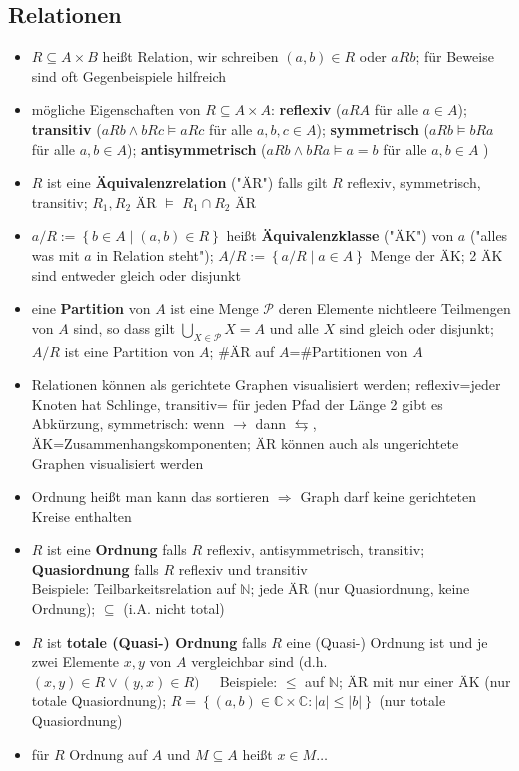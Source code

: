 \documentclass[10pt,a4paper]{article}
\begin{document}
\subsection{Relationen}
\begin{itemize}
\item $R\subseteq A\times B$ heißt Relation, wir schreiben $(a,b) \in R$ oder $aRb$; für Beweise sind oft Gegenbeispiele hilfreich
\item mögliche Eigenschaften von $R\subseteq A\times A$: \textbf{reflexiv} ($aRA$ für alle $a\in A$); \textbf{transitiv} ($aRb\land bRc \models aRc$ für alle $a,b,c\in A$); \textbf{symmetrisch} ($aRb\models bRa$ für alle $a,b \in A$); \textbf{antisymmetrisch} ($aRb\land bRa \models a=b$ für alle $a,b\in A$ )
\item $R$ ist eine \textbf{Äquivalenzrelation} ("ÄR") falls gilt $R$ reflexiv, symmetrisch, transitiv; $R_{1},R_{2}$ ÄR $\models$ $R_{1}\cap R_{2}$ ÄR 
\item $a/R:=\left\lbrace b\in A\mid (a,b) \in R\right\rbrace$ heißt \textbf{Äquivalenzklasse} ("ÄK") von $a$ ("alles was mit $a$ in Relation steht"); $A/R:=\left\lbrace a/R\mid a\in A\right\rbrace$ Menge der ÄK;
2 ÄK sind entweder gleich oder disjunkt
\item eine \textbf{Partition} von $A$ ist eine Menge $\mathcal{P}$ deren Elemente nichtleere Teilmengen von $A$ sind, so dass gilt $\bigcup_{X\in \mathcal{P}} X=A$ und alle $X$ sind gleich oder disjunkt; $A/R$ ist eine Partition von $A$; \#ÄR auf $A$=\#Partitionen von $A$
\item Relationen können als gerichtete Graphen visualisiert werden; reflexiv=jeder Knoten hat Schlinge, transitiv= für jeden Pfad der Länge 2 gibt es Abkürzung, symmetrisch: wenn $\rightarrow$ dann $\leftrightarrows$, ÄK=Zusammenhangskomponenten; ÄR können auch als ungerichtete Graphen visualisiert werden 
\item Ordnung heißt man kann das sortieren $\Rightarrow$ Graph darf keine gerichteten Kreise enthalten


\item $R$ ist eine \textbf{Ordnung} falls $R$ reflexiv, antisymmetrisch, transitiv; \textbf{Quasiordnung} falls $R$ reflexiv und transitiv\\
Beispiele: Teilbarkeitsrelation auf $\mathbb{N}$; jede ÄR (nur Quasiordnung, keine Ordnung); $\subseteq$ (i.A. nicht total)
\item $R$ ist \textbf{totale (Quasi-) Ordnung} falls $R$ eine (Quasi-) Ordnung ist und je zwei Elemente $x,y$ von $A$ vergleichbar sind (d.h. $(x,y)\in R\lor (y,x)\in R)\;\;\;\;$ Beispiele: $\leq$ auf $\mathbb{N}$; ÄR mit nur einer ÄK (nur totale Quasiordnung); $R=\left\lbrace (a,b) \in \mathbb{C}\times \mathbb{C}: \vert a\vert \leq \vert b \vert \right\rbrace$ (nur totale Quasiordnung)
\item für $R$ Ordnung auf $A$ und $M\subseteq A$ heißt $x\in M\dotsc$ 


\end{itemize}
\end{document}
